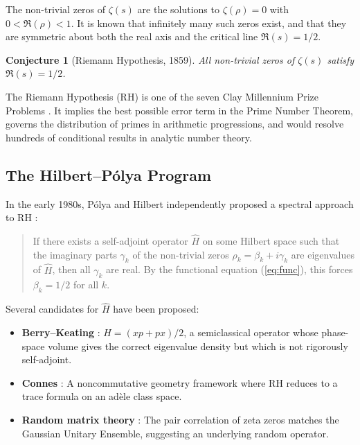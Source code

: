 \documentclass[11pt,a4paper]{article}
\newtheorem{conjecture}[theorem]{Conjecture}
\theoremstyle{definition}
\begin{document}
The non-trivial zeros of $\zeta(s)$ are the solutions to
$\zeta(\rho) = 0$ with $0 < \Re(\rho) < 1$. It is known
\cite{hadamard1896,vallee1896} that infinitely many such zeros exist,
and that they are symmetric about both the real axis and the critical
line $\Re(s) = 1/2$.

\begin{conjecture}[Riemann Hypothesis, 1859]
All non-trivial zeros of $\zeta(s)$ satisfy $\Re(s) = 1/2$.
\end{conjecture}

The Riemann Hypothesis (RH) is one of the seven Clay Millennium Prize
Problems \cite{carlson2006}. It implies the best possible error term
in the Prime Number Theorem, governs the distribution of primes in
arithmetic progressions, and would resolve hundreds of conditional
results in analytic number theory.

\subsection{The Hilbert--P\'{o}lya Program}

In the early 1980s, P\'{o}lya and Hilbert independently proposed a
spectral approach to RH \cite{montgomery1973,odlyzko1987}:

\begin{quote}
If there exists a self-adjoint operator $\hat{H}$ on some Hilbert
space such that the imaginary parts $\gamma_k$ of the non-trivial
zeros $\rho_k = \beta_k + i\gamma_k$ are eigenvalues of $\hat{H}$,
then all $\gamma_k$ are real. By the functional equation
(\ref{eq:func}), this forces $\beta_k = 1/2$ for all $k$.
\end{quote}

Several candidates for $\hat{H}$ have been proposed:

\begin{itemize}
\item \textbf{Berry--Keating} \cite{berry1999}: $H = (xp + px)/2$, a
  semiclassical operator whose phase-space volume gives the correct
  eigenvalue density but which is not rigorously self-adjoint.
\item \textbf{Connes} \cite{connes1999}: A noncommutative geometry
  framework where RH reduces to a trace formula on an ad\`{e}le class
  space.
\item \textbf{Random matrix theory} \cite{montgomery1973,keating2000}:
  The pair correlation of zeta zeros matches the Gaussian Unitary
  Ensemble, suggesting an underlying random operator.
\end{itemize}
\end{document}
